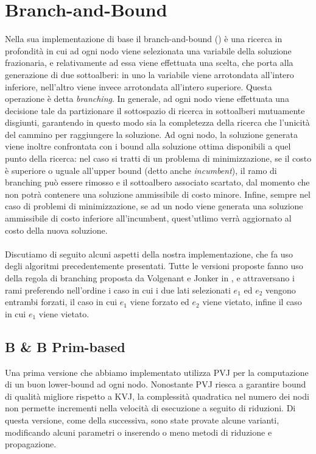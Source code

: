 \section{Branch-and-Bound}
Nella sua implementazione di base il branch-and-bound (\citet*{land1960automatic}) è una ricerca in profondità in cui ad ogni nodo viene selezionata una variabile della soluzione frazionaria, e relativamente ad essa viene effettuata una scelta, che porta alla generazione di due sottoalberi: in uno la variabile viene arrotondata all'intero inferiore, nell'altro viene invece arrotondata all'intero superiore. Questa operazione è detta \emph{branching}. In generale, ad ogni nodo viene effettuata una decisione tale da partizionare il sottospazio di ricerca in sottoalberi mutuamente disgiunti, garantendo in questo modo sia la completezza della ricerca che l'unicità del cammino per raggiungere la soluzione. Ad ogni nodo, la soluzione generata viene inoltre confrontata con i bound alla soluzione ottima disponibili a quel punto della ricerca: nel caso si tratti di un problema di minimizzazione, se il costo è superiore o uguale all'upper bound (detto anche \emph{incumbent}), il ramo di branching può essere rimosso e il sottoalbero associato scartato, dal momento che non potrà contenere una soluzione ammissibile di costo minore. Infine, sempre nel caso di problemi di minimizzazione, se ad un nodo viene generata una soluzione ammissibile di costo inferiore all'incumbent, quest'utlimo verrà aggiornato al costo della nuova soluzione.
\paragraph*{}
Discutiamo di seguito alcuni aspetti della nostra implementazione, che fa uso degli algoritmi precedentemente presentati. Tutte le versioni proposte fanno uso della regola di branching proposta da Volgenant e Jonker in \citep{volgenant1982branch}, e attraversano i rami preferendo nell'ordine i caso in cui i due lati selezionati $e_1$ ed $e_2$ vengono entrambi forzati, il caso in cui $e_1$ viene forzato ed $e_2$ viene vietato, infine il caso in cui $e_1$ viene vietato. 
\subsection{B \& B Prim-based}
Una prima versione che abbiamo implementato utilizza PVJ per la computazione di un buon lower-bound ad ogni nodo. Nonostante PVJ riesca a garantire bound di qualità migliore rispetto a KVJ, la complessità quadratica nel numero dei nodi non permette incrementi nella velocità di esecuzione a seguito di riduzioni. Di questa versione, come della successiva, sono state provate alcune varianti, modificando alcuni parametri o inserendo o meno metodi di riduzione e propagazione.

